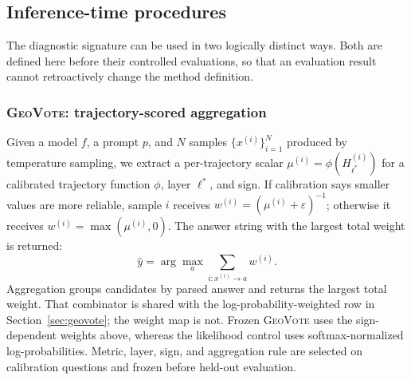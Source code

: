 \subsection{Inference-time procedures}
\label{sec:inference-procedures}

The diagnostic signature can be used in two logically distinct ways.  Both are
defined here before their controlled evaluations, so that an evaluation result
cannot retroactively change the method definition.

\subsubsection{\textsc{GeoVote}: trajectory-scored aggregation}
\label{sec:geovote-method}

Given a model $f$, a prompt $p$, and $N$ samples $\{x^{(i)}\}_{i=1}^{N}$ produced by
temperature sampling, we extract a per-trajectory scalar
$\mu^{(i)} = \phi(H^{(i)}_{\ell^*})$ for a calibrated trajectory function $\phi$,
layer $\ell^*$, and sign. If calibration says smaller values are more reliable, sample
$i$ receives $w^{(i)}=(\mu^{(i)}+\varepsilon)^{-1}$; otherwise it receives
$w^{(i)}=\max(\mu^{(i)},0)$. The answer string with the largest total weight
is returned:
\begin{equation}
\label{eq:geovote}
\hat{y}=\arg\max_{a}\sum_{i:x^{(i)}\to a}w^{(i)} .
\end{equation}
Aggregation groups candidates by parsed answer and returns the largest total
weight. That combinator is shared with the log-probability-weighted row in
Section~\ref{sec:geovote}; the weight map is not. Frozen \textsc{GeoVote} uses
the sign-dependent weights above, whereas the likelihood control uses
softmax-normalized log-probabilities.
Metric, layer, sign, and aggregation rule are selected on calibration questions
and frozen before held-out evaluation.

\begin{center}
\end{center}

